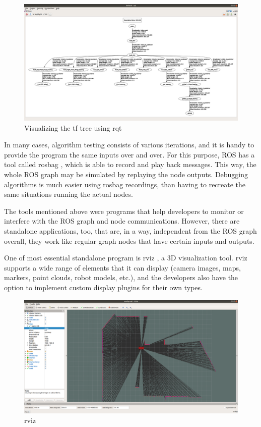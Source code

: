\begin{figure}[!ht]
	\centering
	\includegraphics[width=\textwidth]{figures/raw/rqt.png}
	\caption{Visualizing the tf tree using rqt}
	\label{rqt_graph}
\end{figure}

In many cases, algorithm testing consists of various iterations, and it is handy to provide the program the same inputs over and over. For this purpose, ROS has a tool called rosbag \cite{ros_rosbag}, which is able to record and play back messages. This way, the whole ROS graph may be simulated by replaying the node outputs. Debugging algorithms is much easier using rosbag recordings, than having to recreate the same situations running the actual nodes.

The tools mentioned above were programs that help developers to monitor or interfere with the ROS graph and node communications. However, there are standalone applications, too, that are, in a way, independent from the ROS graph overall, they work like regular graph nodes that have certain inputs and outputs.

One of most essential standalone program is rviz \cite{ros_rviz}, a 3D visualization tool. rviz supports a wide range of elements that it can display (camera images, maps, markers, point clouds, robot models, etc.), and the developers also have the option to implement custom display plugins for their own types.

\begin{figure}[!ht]
	\centering
	\includegraphics[width=\textwidth]{figures/raw/rviz.png}
	\caption{rviz}
	\label{rviz}
\end{figure}

